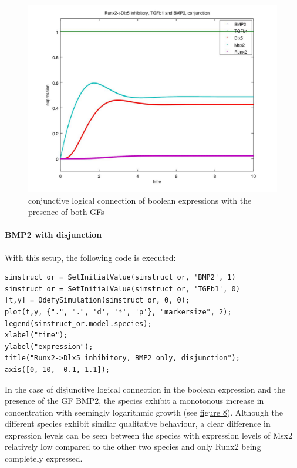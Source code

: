 \documentclass[11pt]{article}
\begin{document}
\begin{figure}[!htb]
	\centering
	\includegraphics[scale=0.55]{case3.jpg}
	\caption{\label{thirdCase} conjunctive logical connection of boolean expressions with the presence of both GFs}
\end{figure}

\paragraph{BMP2 with disjunction}
With this setup, the following code is executed:
\begin{lstlisting}
simstruct_or = SetInitialValue(simstruct_or, 'BMP2', 1)
simstruct_or = SetInitialValue(simstruct_or, 'TGFb1', 0)
[t,y] = OdefySimulation(simstruct_or, 0, 0);
plot(t,y, {".", ".", 'd', '*', 'p'}, "markersize", 2);
legend(simstruct_or.model.species);
xlabel("time");
ylabel("expression");
title("Runx2->Dlx5 inhibitory, BMP2 only, disjunction");
axis([0, 10, -0.1, 1.1]);
\end{lstlisting}
In the case of disjunctive logical connection in the boolean expression and the presence of the GF BMP2, the species exhibit a monotonous increase in concentration with seemingly logarithmic growth (see \hyperref[fourthCase]{figure 8}). Although the different species exhibit similar qualitative behaviour, a clear difference in expression levels can be seen between the species with expression levels of Msx2 relatively low compared to the other two species and only Runx2 being completely expressed.
\end{document}

